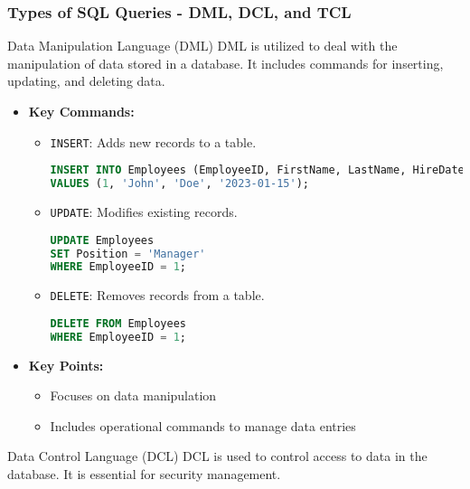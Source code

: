 \documentclass[aspectratio=169]{beamer}
\begin{document}
\begin{frame}[fragile]
    \frametitle{Types of SQL Queries - DML, DCL, and TCL}
    
    \begin{block}{Data Manipulation Language (DML)}
        DML is utilized to deal with the manipulation of data stored in a database. 
        It includes commands for inserting, updating, and deleting data.
    \end{block}
    
    \begin{itemize}
        \item \textbf{Key Commands:}
        \begin{itemize}
            \item \texttt{INSERT}: Adds new records to a table.
            \begin{lstlisting}[language=SQL]
INSERT INTO Employees (EmployeeID, FirstName, LastName, HireDate)
VALUES (1, 'John', 'Doe', '2023-01-15');
            \end{lstlisting}
            
            \item \texttt{UPDATE}: Modifies existing records.
            \begin{lstlisting}[language=SQL]
UPDATE Employees 
SET Position = 'Manager' 
WHERE EmployeeID = 1;
            \end{lstlisting}
            
            \item \texttt{DELETE}: Removes records from a table.
            \begin{lstlisting}[language=SQL]
DELETE FROM Employees 
WHERE EmployeeID = 1;
            \end{lstlisting}
        \end{itemize}
        
        \item \textbf{Key Points:}
        \begin{itemize}
            \item Focuses on data manipulation
            \item Includes operational commands to manage data entries
        \end{itemize}
    \end{itemize}
    
    \begin{block}{Data Control Language (DCL)}
        DCL is used to control access to data in the database. 
        It is essential for security management.
    \end{block}


\end{frame}
\end{document}
